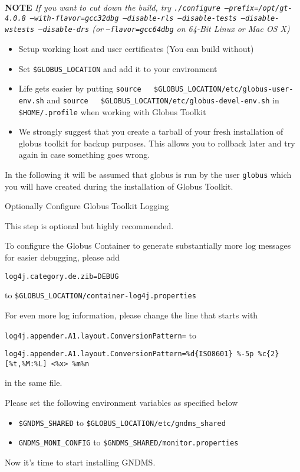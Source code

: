 \documentclass{article}
\begin{document}
\textbf{NOTE}
\emph{If you want to cut down the build, try \texttt{./configure   --prefix=/opt/gt-4.0.8 --with-flavor=gcc32dbg --disable-rls   --disable-tests --disable-wstests --disable-drs} (or \texttt{--flavor=gcc64dbg} on 64-Bit Linux or Mac OS X)}

\begin{itemize}
\item
  Setup working host and user certificates (You can build without)
\item
  Set \verb!$GLOBUS_LOCATION! and add it to your environment
\item
  Life gets easier by putting
  \verb!source   $GLOBUS_LOCATION/etc/globus-user-env.sh! and
  \verb!source   $GLOBUS_LOCATION/etc/globus-devel-env.sh! in
  \verb!$HOME/.profile! when working with Globus Toolkit
\item
  We strongly suggest that you create a tarball of your fresh
  installation of globus toolkit for backup purposes. This allows you
  to rollback later and try again in case something goes wrong.
\end{itemize}
In the following it will be assumed that globus is run by the user
\verb!globus! which you will have created during the installation
of Globus Toolkit.

Optionally Configure Globus Toolkit Logging

This step is optional but highly recommended.

To configure the Globus Container to generate substantially more
log messages for easier debugging, please add

\begin{verbatim}
log4j.category.de.zib=DEBUG
\end{verbatim}
to \verb!$GLOBUS_LOCATION/container-log4j.properties!

For even more log information, please change the line that starts
with 

\verb!log4j.appender.A1.layout.ConversionPattern=! to

\begin{verbatim}
log4j.appender.A1.layout.ConversionPattern=%d{ISO8601} %-5p %c{2} [%t,%M:%L] <%x> %m%n
\end{verbatim}
in the same file.

Please set the following environment variables as specified below

\begin{itemize}
\item
  \verb!$GNDMS_SHARED! to \verb!$GLOBUS_LOCATION/etc/gndms_shared!
\item
  \verb!GNDMS_MONI_CONFIG! to \verb!$GNDMS_SHARED/monitor.properties!
\end{itemize}
Now it's time to start installing GNDMS.
\end{document}
